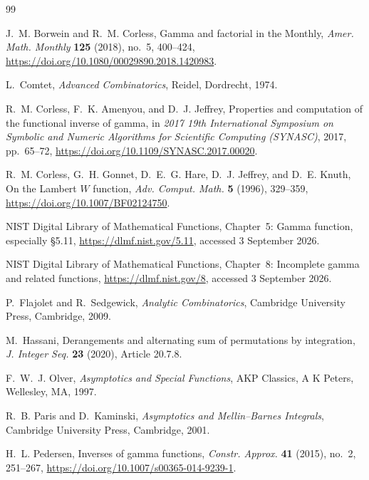 \documentclass[11pt,a4paper]{article}
\numberwithin{equation}{section}
\theoremstyle{definition}
\theoremstyle{remark}
\begin{document}
\begin{thebibliography}{99}

J.~M. Borwein and R.~M. Corless,
\newblock Gamma and factorial in the Monthly,
\newblock \emph{Amer. Math. Monthly} \textbf{125} (2018), no.~5, 400--424,
\newblock \url{https://doi.org/10.1080/00029890.2018.1420983}.

L.~Comtet,
\newblock \emph{Advanced Combinatorics},
\newblock Reidel, Dordrecht, 1974.

R.~M. Corless, F.~K. Amenyou, and D.~J. Jeffrey,
\newblock Properties and computation of the functional inverse of gamma,
\newblock in \emph{2017 19th International Symposium on Symbolic and Numeric
Algorithms for Scientific Computing (SYNASC)}, 2017, pp.~65--72,
\newblock \url{https://doi.org/10.1109/SYNASC.2017.00020}.

R.~M. Corless, G.~H. Gonnet, D.~E.~G. Hare, D.~J. Jeffrey, and D.~E. Knuth,
\newblock On the Lambert $W$ function,
\newblock \emph{Adv. Comput. Math.} \textbf{5} (1996), 329--359,
\newblock \url{https://doi.org/10.1007/BF02124750}.

NIST Digital Library of Mathematical Functions,
\newblock Chapter~5: Gamma function, especially \S5.11,
\newblock \url{https://dlmf.nist.gov/5.11}, accessed 3 September 2026.

NIST Digital Library of Mathematical Functions,
\newblock Chapter~8: Incomplete gamma and related functions,
\newblock \url{https://dlmf.nist.gov/8}, accessed 3 September 2026.

P.~Flajolet and R.~Sedgewick,
\newblock \emph{Analytic Combinatorics},
\newblock Cambridge University Press, Cambridge, 2009.

M.~Hassani,
\newblock Derangements and alternating sum of permutations by integration,
\newblock \emph{J. Integer Seq.} \textbf{23} (2020), Article 20.7.8.

F.~W.~J. Olver,
\newblock \emph{Asymptotics and Special Functions},
\newblock AKP Classics, A K Peters, Wellesley, MA, 1997.

R.~B. Paris and D.~Kaminski,
\newblock \emph{Asymptotics and Mellin--Barnes Integrals},
\newblock Cambridge University Press, Cambridge, 2001.

H.~L. Pedersen,
\newblock Inverses of gamma functions,
\newblock \emph{Constr. Approx.} \textbf{41} (2015), no.~2, 251--267,
\newblock \url{https://doi.org/10.1007/s00365-014-9239-1}.


\end{thebibliography}
\end{document}
